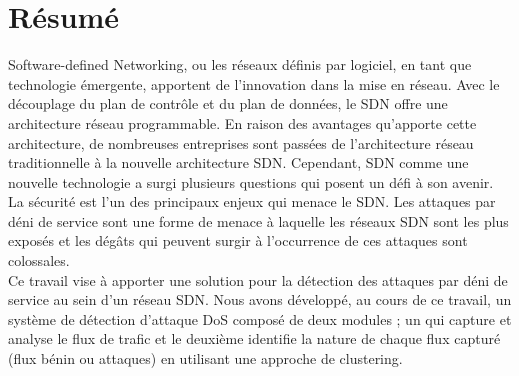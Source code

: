 \chapter{Résumé}

Software-defined Networking, ou les réseaux définis par logiciel, en tant que technologie émergente, apportent de l’innovation dans la mise en réseau. Avec le découplage du plan de contrôle et du plan de données, le SDN offre une architecture  réseau programmable. En raison des avantages qu'apporte cette architecture, de nombreuses entreprises sont passées de l’architecture réseau traditionnelle à la nouvelle architecture SDN. Cependant, SDN comme une nouvelle technologie a surgi plusieurs questions qui posent un défi à son avenir. La sécurité est l’un des principaux enjeux qui menace le SDN. Les attaques par déni de service sont une forme de menace à laquelle les réseaux SDN sont les plus exposés et les dégâts qui peuvent surgir à l’occurrence de ces attaques sont colossales.\\

\noindent Ce travail vise à apporter une solution pour la détection des attaques par déni de service au sein d’un réseau SDN. Nous avons développé, au cours de ce travail, un système de détection d’attaque DoS composé de deux modules ; un qui capture et analyse le flux de trafic et le deuxième identifie la nature de chaque flux capturé (flux bénin ou attaques) en utilisant une approche de clustering. 